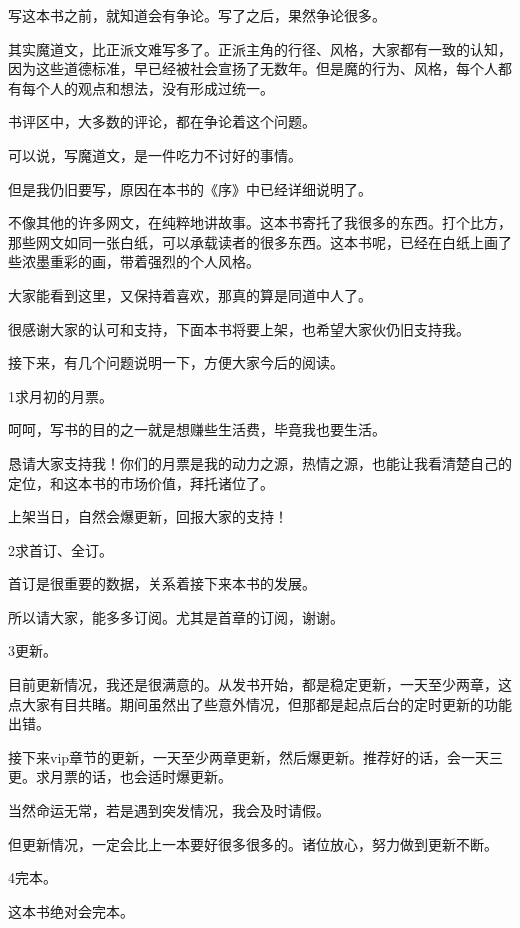 \begin{this_body} \par
写这本书之前，就知道会有争论。写了之后，果然争论很多。

其实魔道文，比正派文难写多了。正派主角的行径、风格，大家都有一致的认知，因为这些道德标准，早已经被社会宣扬了无数年。但是魔的行为、风格，每个人都有每个人的观点和想法，没有形成过统一。

书评区中，大多数的评论，都在争论着这个问题。

可以说，写魔道文，是一件吃力不讨好的事情。

但是我仍旧要写，原因在本书的《序》中已经详细说明了。

不像其他的许多网文，在纯粹地讲故事。这本书寄托了我很多的东西。打个比方，那些网文如同一张白纸，可以承载读者的很多东西。这本书呢，已经在白纸上画了些浓墨重彩的画，带着强烈的个人风格。

大家能看到这里，又保持着喜欢，那真的算是同道中人了。

很感谢大家的认可和支持，下面本书将要上架，也希望大家伙仍旧支持我。

接下来，有几个问题说明一下，方便大家今后的阅读。

1求月初的月票。

呵呵，写书的目的之一就是想赚些生活费，毕竟我也要生活。

恳请大家支持我！你们的月票是我的动力之源，热情之源，也能让我看清楚自己的定位，和这本书的市场价值，拜托诸位了。

上架当日，自然会爆更新，回报大家的支持！

2求首订、全订。

首订是很重要的数据，关系着接下来本书的发展。

所以请大家，能多多订阅。尤其是首章的订阅，谢谢。

3更新。

目前更新情况，我还是很满意的。从发书开始，都是稳定更新，一天至少两章，这点大家有目共睹。期间虽然出了些意外情况，但那都是起点后台的定时更新的功能出错。

接下来vip章节的更新，一天至少两章更新，然后爆更新。推荐好的话，会一天三更。求月票的话，也会适时爆更新。

当然命运无常，若是遇到突发情况，我会及时请假。

但更新情况，一定会比上一本要好很多很多的。诸位放心，努力做到更新不断。

4完本。

这本书绝对会完本。


\end{this_body}
